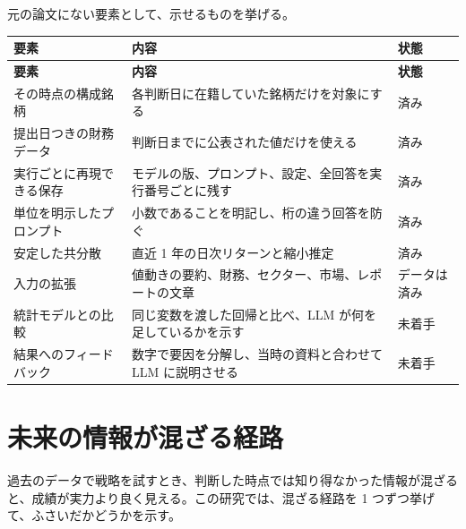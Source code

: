\documentclass[xelatex,ja=standard,jafont=hiragino-pron,a4paper,10pt]{bxjsreport}
\begin{document}
元の論文にない要素として、示せるものを挙げる。

\begin{longtable}{p{4.60cm}p{7.40cm}p{2.40cm}}
\toprule
\textbf{要素} & \textbf{内容} & \textbf{状態} \\
\midrule
\endfirsthead
\toprule
\textbf{要素} & \textbf{内容} & \textbf{状態} \\
\midrule
\endhead
\bottomrule
\endfoot
その時点の構成銘柄 & 各判断日に在籍していた銘柄だけを対象にする & 済み \\
提出日つきの財務データ & 判断日までに公表された値だけを使える & 済み \\
実行ごとに再現できる保存 & モデルの版、プロンプト、設定、全回答を実行番号ごとに残す & 済み \\
単位を明示したプロンプト & 小数であることを明記し、桁の違う回答を防ぐ & 済み \\
安定した共分散 & 直近 1 年の日次リターンと縮小推定 & 済み \\
入力の拡張 & 値動きの要約、財務、セクター、市場、レポートの文章 & データは済み \\
統計モデルとの比較 & 同じ変数を渡した回帰と比べ、LLM が何を足しているかを示す & 未着手 \\
結果へのフィードバック & 数字で要因を分解し、当時の資料と合わせて LLM に説明させる & 未着手 \\
\end{longtable}

\section{未来の情報が混ざる経路}\label{sec:leak}

過去のデータで戦略を試すとき、判断した時点では知り得なかった情報が混ざると、成績が実力より良く見える。この研究では、混ざる経路を 1 つずつ挙げて、ふさいだかどうかを示す。
\end{document}
